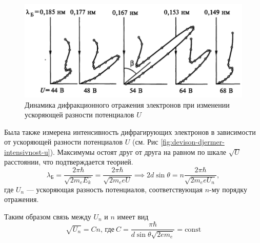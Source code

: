 \begin{figure}[H]
	\centering
	\includegraphics[width=0.8\linewidth]{img/oral-05/devison-djermer-electron-difraction-dynamics}
	\caption{Динамика дифракционного отражения электронов при изменении ускоряющей разности потенциалов $U$}
	\label{fig:devison-djermer-electron-difraction-dynamics}
\end{figure}

Была также измерена интенсивность дифрагирующих электронов в зависимости от ускоряющей разности потенциалов $U$ (см. Рис \ref{fig:devison-djermer-intensivnost-u}). Максимумы остоят друг от друга на равном по шкале $\sqrt{U}$ расстоянии, что подтверждается теорией.
\begin{equation*}
	\lambda_{\text{Б}}=\frac{2\pi\hbar}{\sqrt{2m_eE_k}}=\frac{2\pi\hbar}{\sqrt{2m_eeU}}\implies2d\sin\theta=n\frac{2\pi\hbar}{\sqrt{2m_eeU_n}},
\end{equation*}
где $U_n$ --- ускоряющая разность потенциалов, соответствующая $n$-му порядку отражения.

Таким образом связь между $U_n$ и $n$ имеет вид
\begin{equation*}
	\sqrt{U_n}=Cn,\,\text{где}\: C=\frac{\pi\hbar}{d\sin\theta\sqrt{2em_e}}=\mathrm{const}
\end{equation*}

